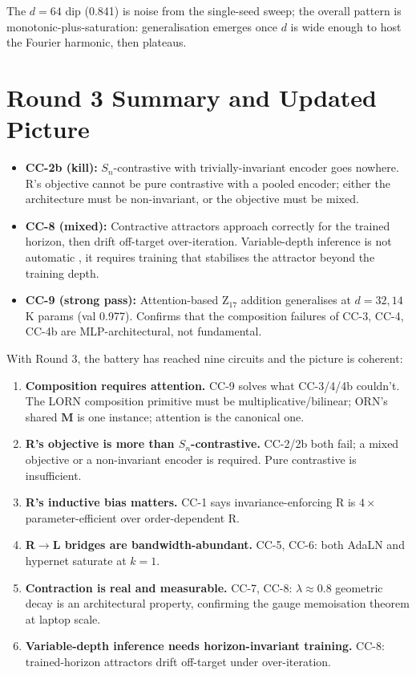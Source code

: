 \documentclass[10pt, twocolumn, a4paper]{article}
\newcommand{\Sn}{S_n}
\newcommand{\M}{\mathbf{M}}
\begin{document}
The $d=64$ dip (0.841) is noise from the single-seed sweep; the overall pattern is monotonic-plus-saturation: generalisation emerges once $d$ is wide enough to host the Fourier harmonic, then plateaus.


\section{Round 3 Summary and Updated Picture}

\begin{itemize}[nosep]
\item \textbf{CC-2b (kill):} $\Sn$-contrastive with trivially-invariant encoder goes nowhere. R's objective cannot be pure contrastive with a pooled encoder; either the architecture must be non-invariant, or the objective must be mixed.
\item \textbf{CC-8 (mixed):} Contractive attractors approach correctly for the trained horizon, then drift off-target over-iteration. Variable-depth inference is not automatic ,  it requires training that stabilises the attractor beyond the training depth.
\item \textbf{CC-9 (strong pass):} Attention-based Z$_{17}$ addition generalises at $d=32, 14$K params (val 0.977). Confirms that the composition failures of CC-3, CC-4, CC-4b are MLP-architectural, not fundamental.
\end{itemize}

With Round 3, the battery has reached nine circuits and the picture is coherent:

\begin{enumerate}[nosep,leftmargin=*]
\item \textbf{Composition requires attention.} CC-9 solves what CC-3/4/4b couldn't. The LORN composition primitive must be multiplicative/bilinear; ORN's shared $\M$ is one instance; attention is the canonical one.
\item \textbf{R's objective is more than $\Sn$-contrastive.} CC-2/2b both fail; a mixed objective or a non-invariant encoder is required. Pure contrastive is insufficient.
\item \textbf{R's inductive bias matters.} CC-1 says invariance-enforcing R is $4\times$ parameter-efficient over order-dependent R.
\item \textbf{R$\to$L bridges are bandwidth-abundant.} CC-5, CC-6: both AdaLN and hypernet saturate at $k=1$.
\item \textbf{Contraction is real and measurable.} CC-7, CC-8: $\lambda \approx 0.8$ geometric decay is an architectural property, confirming the gauge memoisation theorem at laptop scale.
\item \textbf{Variable-depth inference needs horizon-invariant training.} CC-8: trained-horizon attractors drift off-target under over-iteration.
\end{enumerate}
\end{document}
